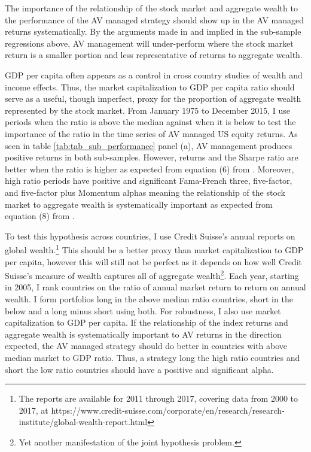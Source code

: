 The importance of the relationship of the stock market and aggregate wealth to the performance of the AV managed strategy should show up in the AV managed returns systematically. By the arguments made in \citet{pollet_average_2010} and implied in the sub-sample regressions above, AV management will under-perform where the stock market return is a smaller portion and less representative of returns to aggregate wealth.

GDP per capita  often appears as a control in cross country studies of wealth and income effects. \citep{barro_cross-country_1989,levine_what_1993,baird_aggregate_2010} Thus, the market capitalization to GDP per capita ratio should serve as a useful, though imperfect, proxy for the proportion of aggregate wealth represented by the stock market. From January 1975 to December 2015, I use periods when the ratio is above the median against when it is below to test the importance of the ratio in the time series of AV managed US equity returns. As seen in table \ref{tab:tab_sub_performance} panel (a), AV management produces positive returns in both sub-samples. However, returns and the Sharpe ratio are better when the ratio is higher as expected from equation (6) from \citet{pollet_average_2010}. Moreover, high ratio periods have positive and significant Fama-French three, five-factor, and five-factor plus Momentum alphas meaning the relationship of the stock market to aggregate wealth is systematically important as expected from equation (8) from \citet{pollet_average_2010}. %

To test this hypothesis across countries, I use Credit Suisse's annual reports on global wealth.\footnote{The reports are available for 2011 through 2017, covering data from 2000 to 2017, at https://www.credit-suisse.com/corporate/en/research/research-institute/global-wealth-report.html} This should be a better proxy than market capitalization to GDP per capita, however this will still not be perfect as it depends on how well Credit Suisse's measure of wealth captures all of aggregate wealth\footnote{Yet another manifestation of the joint hypothesis problem.}. Each year, starting in 2005, I rank countries on the ratio of annual market return to return on annual wealth. I form portfolios long in the above median ratio countries, short in the below and a long minus short using both. For robustness, I also use market capitalization to GDP per capita. If the relationship of the index returns and aggregate wealth is systematically important to AV returns in the direction expected, the AV managed strategy should do better in countries with above median market to GDP ratio. Thus, a strategy long the high ratio countries and short the low ratio countries should have a positive and significant alpha. 

